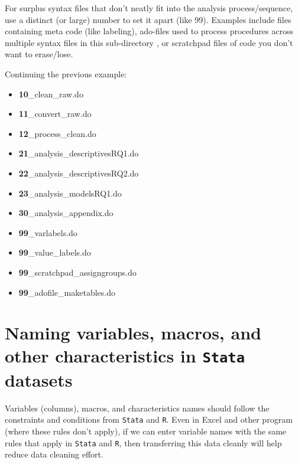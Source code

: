For surplus syntax files that don't neatly fit into the analysis process/sequence, use a distinct (or large) number to set it apart (like 99).  Examples include files containing meta code (like labeling), ado-files used to process procedures across multiple syntax files in this sub-directory , or scratchpad files of code you don't want to erase/lose.

Continuing the previous example:

\linespread{1}

\begin{itemize}[label=]
	\item   {\textcolor{gray!95!}{\textbf{10}\_clean\_raw.do}}
	\item    {\textcolor{gray!95!}{\textbf{11}\_convert\_raw.do}}
	\item    {\textcolor{gray!95!}{\textbf{12}\_process\_clean.do}}
	\item    {\textcolor{gray!95!}{\textbf{21}\_analysis\_descriptivesRQ1.do}}
	\item   {\textcolor{gray!95!}{\textbf{22}\_analysis\_descriptivesRQ2.do}}
	\item    {\textcolor{gray!95!}{\textbf{23}\_analysis\_modelsRQ1.do}}
	\item    {\textcolor{gray!95!}{\textbf{30}\_analysis\_appendix.do}}
	\item    {\textcolor{uscred}{\textbf{99}\_varlabels.do}}
	\item    {\textcolor{uscred}{\textbf{99}\_value\_labels.do}}
	\item    {\textcolor{uscred}{\textbf{99}\_scratchpad\_assigngroups.do}}
	\item    {\textcolor{uscred}{\textbf{99}\_adofile\_maketables.do}}
\end{itemize}
\linespread{1.25}

\section{Naming variables, macros, and other characteristics in \texttt{Stata} datasets} \label{sec:variables}
Variables (columns), macros, and characteristics names should follow the constraints and conditions from \texttt{Stata} and \texttt{R}. Even in Excel and other program (where these rules don't apply), if we can enter variable names with the same rules that apply in \texttt{Stata} and \texttt{R}, then transferring this data cleanly will help reduce data cleaning effort. \\

